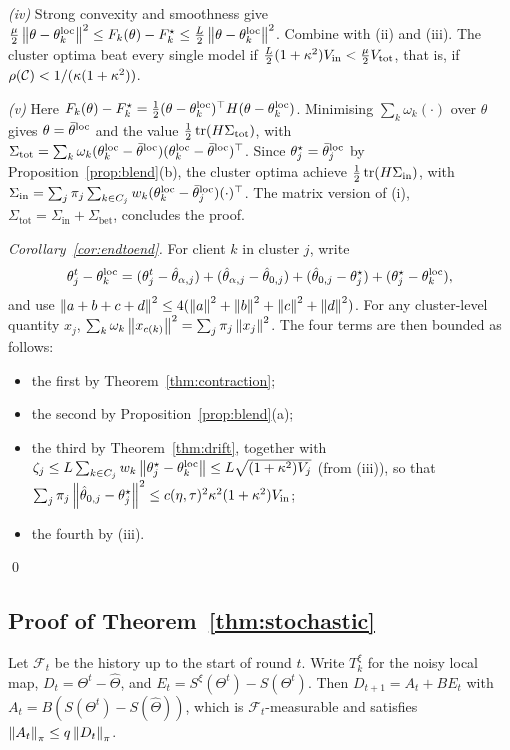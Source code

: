 \emph{(iv)} Strong convexity and smoothness give
$\frac\mu2\left\lVert \theta-\theta_k^{\mathrm{loc}} \right\rVert^2\le F_k(\theta)-F_k^\star\le\frac L2\left\lVert \theta-\theta_k^{\mathrm{loc}} \right\rVert^2$.
Combine with (ii) and (iii). The cluster optima beat every single model if
$\frac L2(1+\kappa^2)V_{\mathrm{in}}<\frac\mu2V_{\mathrm{tot}}$, that is, if $\rho(\mathcal{C})<1/(\kappa(1+\kappa^2))$.

\emph{(v)} Here
$F_k(\theta)-F_k^\star=\frac12(\theta-\theta_k^{\mathrm{loc}})^\top H(\theta-\theta_k^{\mathrm{loc}})$.
Minimising $\sum_k\omega_k(\cdot)$ over $\theta$ gives $\theta=\bar\theta^{\mathrm{loc}}$ and the value
$\frac12\operatorname{tr}(H\Sigma_{\mathrm{tot}})$, with
$\Sigma_{\mathrm{tot}}=\sum_k\omega_k(\theta_k^{\mathrm{loc}}-\bar\theta^{\mathrm{loc}})(\theta_k^{\mathrm{loc}}-\bar\theta^{\mathrm{loc}})^\top$.
Since $\theta_j^\star=\bar\theta^{\mathrm{loc}}_j$ by Proposition~\ref{prop:blend}(b), the cluster
optima achieve $\frac12\operatorname{tr}(H\Sigma_{\mathrm{in}})$, with
$\Sigma_{\mathrm{in}}=\sum_j\pi_j\sum_{k\in C_j}w_k(\theta_k^{\mathrm{loc}}-\bar\theta_j^{\mathrm{loc}})(\cdot)^\top$.
The matrix version of (i), $\Sigma_{\mathrm{tot}}=\Sigma_{\mathrm{in}}+\Sigma_{\mathrm{bet}}$,
concludes the proof.

\emph{Corollary~\ref{cor:endtoend}.} For client $k$ in cluster $j$, write
\[
  \theta^t_j-\theta^{\mathrm{loc}}_k=(\theta^t_j-\hat\theta_{\alpha,j})+(\hat\theta_{\alpha,j}-\hat\theta_{0,j})+(\hat\theta_{0,j}-\theta^\star_j)+(\theta^\star_j-\theta^{\mathrm{loc}}_k),
\]
and use $\left\lVert a+b+c+d \right\rVert^2\le4(\left\lVert a \right\rVert^2+\left\lVert b \right\rVert^2+\left\lVert c \right\rVert^2+\left\lVert d \right\rVert^2)$. For any
cluster-level quantity $x_j$, $\sum_k\omega_k\left\lVert x_{c(k)} \right\rVert^2=\sum_j\pi_j\left\lVert x_j \right\rVert^2$. The
four terms are then bounded as follows:
\begin{itemize}[leftmargin=1.2em,itemsep=1pt]
  \item the first by Theorem~\ref{thm:contraction};
  \item the second by Proposition~\ref{prop:blend}(a);
  \item the third by Theorem~\ref{thm:drift}, together with
    $\zeta_j\le L\sum_{k\in C_j}w_k\left\lVert \theta_j^\star-\theta_k^{\mathrm{loc}} \right\rVert\le L\sqrt{(1+\kappa^2)V_j}$
    (from (iii)), so that $\sum_j\pi_j\left\lVert \hat\theta_{0,j}-\theta_j^\star \right\rVert^2\le c(\eta,\tau)^2\kappa^2(1+\kappa^2)V_{\mathrm{in}}$;
  \item the fourth by (iii).
\end{itemize}
\qed

\subsection{Proof of Theorem~\ref{thm:stochastic}}
Let $\mathcal F_t$ be the history up to the start of round $t$. Write $T_k^\xi$ for the noisy
local map, $D_t=\Theta^t-\hat\Theta$, and $E_t=S^\xi(\Theta^t)-S(\Theta^t)$. Then
$D_{t+1}=A_t+BE_t$ with $A_t=B(S(\Theta^t)-S(\hat\Theta))$, which is
$\mathcal F_t$-measurable and satisfies $\left\lVert A_t \right\rVert_{\pi}\le q\left\lVert D_t \right\rVert_{\pi}$.

